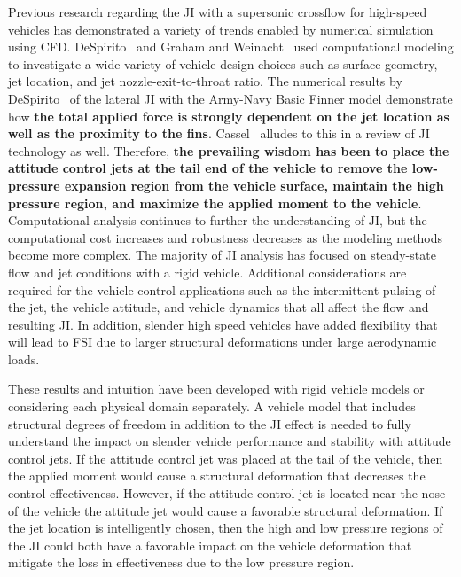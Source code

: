 \documentclass[12pt]{article}
\begin{document}
Previous research regarding the JI with a supersonic crossflow for high-speed vehicles has demonstrated a variety of trends enabled by numerical simulation using CFD. DeSpirito~\cite{despirito2011factors} and Graham and Weinacht~\cite{graham1999numerical} used computational modeling to investigate a wide variety of vehicle design choices such as surface geometry, jet location, and jet nozzle-exit-to-throat ratio. The numerical results by DeSpirito~\cite{despirito2012lateral} of the lateral JI with the Army-Navy Basic Finner model demonstrate how \textbf{the total applied force is strongly dependent on the jet location as well as the proximity to the fins}. Cassel~\cite{cassel2003applying} alludes to this in a review of JI technology as well. Therefore, \textbf{the prevailing wisdom has been to place the attitude control jets at the tail end of the vehicle to remove the low-pressure expansion region from the vehicle surface, maintain the high pressure region, and maximize the applied moment to the vehicle}. Computational analysis continues to further the understanding of JI, but the computational cost increases and robustness decreases as the modeling methods become more complex. The majority of JI analysis has focused on steady-state flow and jet conditions with a rigid vehicle. Additional considerations are required for the vehicle control applications such as the intermittent pulsing of the jet, the vehicle attitude, and vehicle dynamics that all affect the flow and resulting JI. In addition, slender high speed vehicles have added flexibility that will lead to FSI due to larger structural deformations under large aerodynamic loads. 

These results and intuition have been developed with rigid vehicle models or considering each physical domain separately. A vehicle model that includes structural degrees of freedom in addition to the JI effect is needed to fully understand the impact on slender vehicle performance and stability with attitude control jets. If the attitude control jet was placed at the tail of the vehicle, then the applied moment would cause a structural deformation that decreases the control effectiveness. However, if the attitude control jet is located near the nose of the vehicle the attitude jet would cause a favorable structural deformation. If the jet location is intelligently chosen, then the high and low pressure regions of the JI could both have a favorable impact on the vehicle deformation that mitigate the loss in effectiveness due to the low pressure region.
\end{document}
